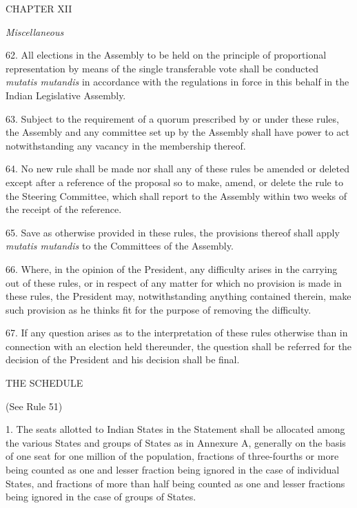 \begin{center}
CHAPTER XII\end{center}
\begin{center}
\emph{Miscellaneous}\end{center}


62. All elections in the Assembly to be held on the principle of proportional representation by means of the single transferable vote shall be conducted \emph{mutatis mutandis} in accordance with the regulations in force in this behalf in the Indian Legislative Assembly.



63. Subject to the requirement of a quorum prescribed by or under these rules, the Assembly and any committee set up by the Assembly shall have power to act notwithstanding any vacancy in the membership thereof.



64. No new rule shall be made nor shall any of these rules be amended or deleted except after a reference of the proposal so to make, amend, or delete the rule to the Steering Committee, which shall report to the Assembly within two weeks of the receipt of the reference.



65. Save as otherwise provided in these rules, the provisions thereof shall apply \emph{mutatis mutandis} to the Committees of the Assembly.



66. Where, in the opinion of the President, any difficulty arises in the carrying out of these rules, or in respect of any matter for which no provision is made in these rules, the President may, notwithstanding anything contained therein, make such provision as he thinks fit for the purpose of removing the difficulty.



67. If any question arises as to the interpretation of these rules otherwise than in connection with an election held thereunder, the question shall be referred for the decision of the President and his decision shall be final.



\begin{center}
THE SCHEDULE \end{center}
\begin{center}
(See Rule 51) \end{center}


1. The seats allotted to Indian States in the Statement shall be allocated among the various States and groups of States as in Annexure A, generally on the basis of one seat for one million of the population, fractions of three-fourths or more being counted as one and lesser fraction being ignored in the case of individual States, and fractions of more than half being counted as one and lesser fractions being ignored in the case of groups of States.



